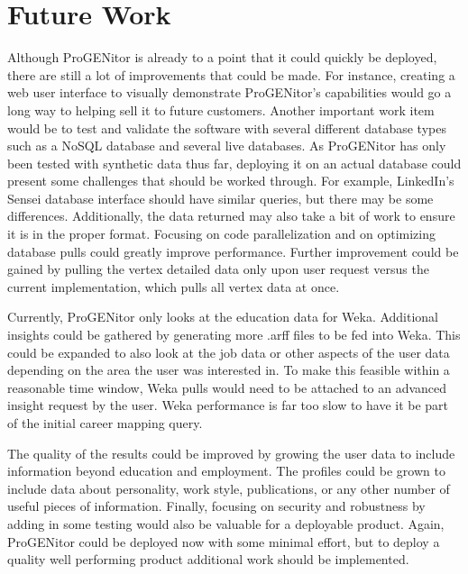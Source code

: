 \section{Future Work}
\label{sect:future-work}
Although ProGENitor is already to a point that it could quickly be deployed,
there are still a lot of improvements that could be made.  For
instance, creating a web user interface to visually demonstrate ProGENitor's
capabilities would go a long way to helping sell it to future customers. 
Another important work item would be to test and validate the software with
several different database types such as a NoSQL database and several live
databases.  As ProGENitor has only been tested with synthetic data thus far,
deploying it on an actual database could present some challenges that should be
worked through.  For example, LinkedIn's Sensei database interface should have
similar queries, but there may be some differences.  Additionally, the data
returned may also take a bit of work to ensure it is in the proper format. 
Focusing on code parallelization and on optimizing database pulls could greatly
improve performance.  Further improvement could be gained by pulling the vertex
detailed data only upon user request versus the current implementation, which
pulls all vertex data at once.

Currently, ProGENitor only looks at the education data for Weka.  Additional
insights could be gathered by generating more .arff files to be fed into
Weka.  This could be expanded to also look at the job data or other aspects of
the user data depending on the area the user was interested in.  To make this
feasible within a reasonable time window, Weka pulls would need to be attached
to an advanced insight request by the user.  Weka performance is far too slow to
have it be part of the initial career mapping query.

The quality of the results could be improved by growing the user data to include
information beyond education and employment.  The profiles could be grown to
include data about personality, work style, publications, or any other number of
useful pieces of information.  Finally, focusing on security and robustness by
adding in some testing would also be valuable for a deployable product.  Again,
ProGENitor could be deployed now with some minimal effort, but to deploy a
quality well performing product additional work should be implemented.
